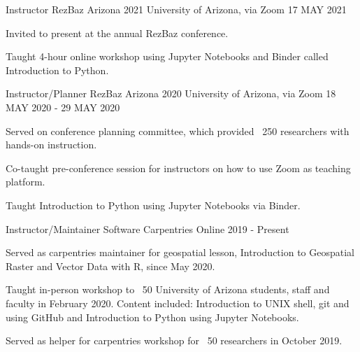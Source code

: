 


\begin{cventries}

\cventry
{Instructor} %
{RezBaz Arizona 2021} %
{University of Arizona, via Zoom} %
{17 MAY 2021} %
{ %
\begin{cvitems}
\item {Invited to present at the annual RezBaz conference.}
\item {Taught 4-hour online workshop using Jupyter Notebooks and Binder called Introduction to Python.}
\end{cvitems}
}

\cventry
{Instructor/Planner} %
{RezBaz Arizona 2020} %
{University of Arizona, via Zoom} %
{18 MAY 2020 - 29 MAY 2020} %
{ %
\begin{cvitems}
\item {Served on conference planning committee, which provided ~250 researchers with hands-on instruction.}
\item {Co-taught pre-conference session for instructors on how to use Zoom as teaching platform.}
\item {Taught Introduction to Python using Jupyter Notebooks via Binder.}
\end{cvitems}
}

\cventry
{Instructor/Maintainer} %
{Software Carpentries} %
{Online} %
{2019 - Present} %
{ %
\begin{cvitems}
\item {Served as carpentries maintainer for geospatial lesson, Introduction to Geospatial Raster and Vector Data with R, since May 2020.}
\item {Taught in-person workshop to ~50 University of Arizona students, staff and faculty in February 2020. Content included: Introduction to UNIX shell, git and using GitHub and Introduction to Python using Jupyter Notebooks.}
\item {Served as helper for carpentries workshop for ~50 researchers in October 2019.}
\end{cvitems}
}


\end{cventries}
